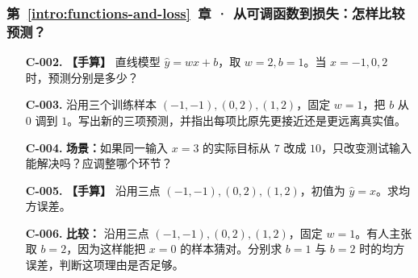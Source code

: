 \subsubsection*{第~\ref*{intro:functions-and-loss}~章 · 从可调函数到损失：怎样比较预测？}
\begin{enumerate}[label={},leftmargin=4.8em,itemsep=4pt]
\item[\textbf{C-002.}] \leavevmode{}\label{exercise:C-002}\label{exercise:linear-prediction}\textbf{【手算】} 直线模型 $\widehat{y}=wx+b$，取 $w=2,b=1$。当 $x=-1,0,2$ 时，预测分别是多少？
\item[\textbf{C-003.}] \leavevmode{}\label{exercise:C-003}\label{exercise:bias-shift}沿用三个训练样本 $(-1,-1),(0,2),(1,2)$，固定 $w=1$，把 $b$ 从 $0$ 调到 $1$。写出新的三项预测，并指出每项比原先更接近还是更远离真实值。
\item[\textbf{C-004.}] \leavevmode{}\label{exercise:C-004}\label{exercise:target-change}\textbf{场景：}如果同一输入 $x=3$ 的实际目标从 $7$ 改成 $10$，只改变测试输入能解决吗？应调整哪个环节？
\item[\textbf{C-005.}] \leavevmode{}\label{exercise:C-005}\label{exercise:three-point-mse}\textbf{【手算】} 沿用三点 $(-1,-1),(0,2),(1,2)$，初值为 $\widehat{y}=x$。求均方误差。
\item[\textbf{C-006.}] \leavevmode{}\label{exercise:C-006}\label{exercise:bias-candidate-comparison}\textbf{比较：} 沿用三点 $(-1,-1),(0,2),(1,2)$，固定 $w=1$。有人主张取 $b=2$，因为这样能把 $x=0$ 的样本猜对。分别求 $b=1$ 与 $b=2$ 时的均方误差，判断这项理由是否足够。
\end{enumerate}
